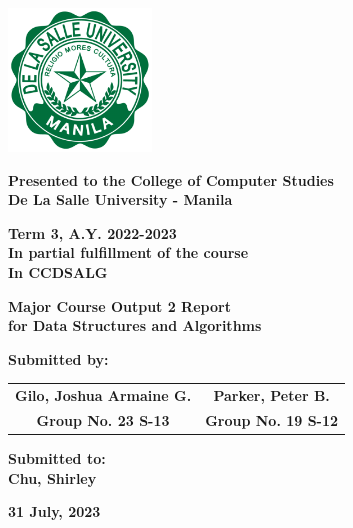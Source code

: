 \begin{titlepage}
    \centering
    \vfill

    \includegraphics[width=1.5in]{photos/logos/dlsu_logo.png}
    \vfill

    {\textbf{\Large Presented to the College of Computer Studies} \\
    \textbf{\Large De La Salle University - Manila} \\
    \vfill

    \textbf{\large Term 3, A.Y. 2022-2023} \\
    \textbf{\large In partial fulfillment of the course} \\
    \textbf{\large In CCDSALG} \\
    \vfill

    \textbf{\Huge Major Course Output 2 Report} \\
    \textbf{\Huge for Data Structures and Algorithms} \\
    \vfill

    \textbf{\Large Submitted by:} \\
    
    \begin{tabular}{cc}
        \textbf{\large Gilo, Joshua Armaine G.} & \textbf{\large Parker, Peter B.} \\
        \textbf{\large Group No. 23 S-13} & \textbf{\large Group No. 19 S-12}
    \end{tabular}
    
    \vfill

    \textbf{\Large Submitted to:} \\
    \textbf{\Large Chu, Shirley} \\
    \vfill

    \textbf{\Large 31 July, 2023} \\
}
\end{titlepage}

